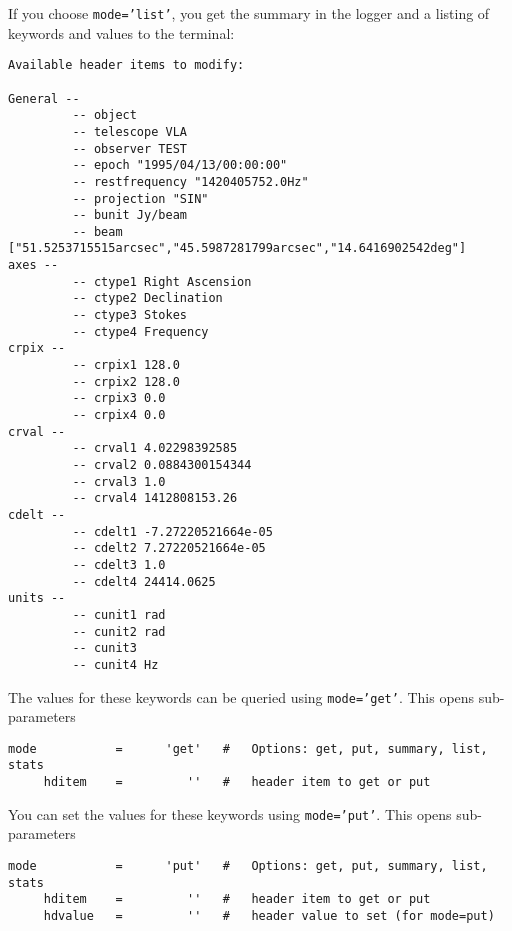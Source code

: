 If you choose {\tt mode='list'}, you get the summary in the logger and
a listing of keywords and values to the terminal:
\small
\begin{verbatim}
Available header items to modify:

General --
         -- object  
         -- telescope VLA
         -- observer TEST
         -- epoch "1995/04/13/00:00:00"
         -- restfrequency "1420405752.0Hz"
         -- projection "SIN"
         -- bunit Jy/beam
         -- beam ["51.5253715515arcsec","45.5987281799arcsec","14.6416902542deg"]
axes --
         -- ctype1 Right Ascension
         -- ctype2 Declination
         -- ctype3 Stokes
         -- ctype4 Frequency
crpix --
         -- crpix1 128.0
         -- crpix2 128.0
         -- crpix3 0.0
         -- crpix4 0.0
crval --
         -- crval1 4.02298392585
         -- crval2 0.0884300154344
         -- crval3 1.0
         -- crval4 1412808153.26
cdelt --
         -- cdelt1 -7.27220521664e-05
         -- cdelt2 7.27220521664e-05
         -- cdelt3 1.0
         -- cdelt4 24414.0625
units --
         -- cunit1 rad
         -- cunit2 rad
         -- cunit3 
         -- cunit4 Hz

\end{verbatim}
\normalsize

The values for these keywords can be queried using
{\tt mode='get'}.  This opens sub-parameters
\small
\begin{verbatim}
mode           =      'get'   #   Options: get, put, summary, list, stats
     hditem    =         ''   #   header item to get or put
\end{verbatim}
\normalsize
You can set the values for these keywords using
{\tt mode='put'}.  This opens sub-parameters
\small
\begin{verbatim}
mode           =      'put'   #   Options: get, put, summary, list, stats
     hditem    =         ''   #   header item to get or put
     hdvalue   =         ''   #   header value to set (for mode=put)
\end{verbatim}
\normalsize

